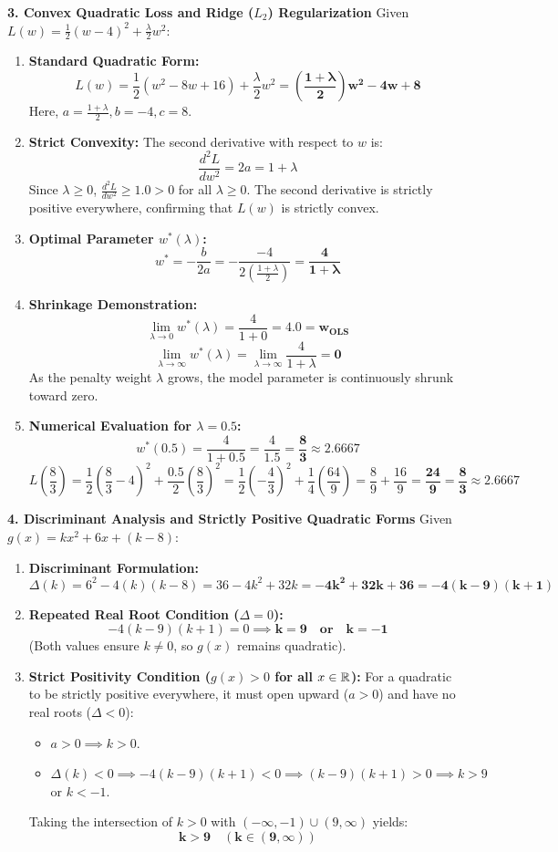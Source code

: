 \textbf{3. Convex Quadratic Loss and Ridge ($L_2$) Regularization}
Given $L(w) = \frac{1}{2}(w - 4)^2 + \frac{\lambda}{2} w^2$:
\begin{enumerate}
    \item \textbf{Standard Quadratic Form:}
    $$L(w) = \frac{1}{2}(w^2 - 8w + 16) + \frac{\lambda}{2}w^2 = \mathbf{\left(\frac{1 + \lambda}{2}\right)w^2 - 4w + 8}$$
    Here, $a = \frac{1 + \lambda}{2}, b = -4, c = 8$.
    \item \textbf{Strict Convexity:}
    The second derivative with respect to $w$ is:
    $$\frac{d^2 L}{dw^2} = 2a = 1 + \lambda$$
    Since $\lambda \ge 0$, $\frac{d^2 L}{dw^2} \ge 1.0 > 0$ for all $\lambda \ge 0$. The second derivative is strictly positive everywhere, confirming that $L(w)$ is strictly convex.
    \item \textbf{Optimal Parameter $w^*(\lambda)$:}
    $$w^* = -\frac{b}{2a} = -\frac{-4}{2\left(\frac{1 + \lambda}{2}\right)} = \mathbf{\frac{4}{1 + \lambda}}$$
    \item \textbf{Shrinkage Demonstration:}
    $$\lim_{\lambda \to 0} w^*(\lambda) = \frac{4}{1 + 0} = \mathbf{4.0 = w_{\text{OLS}}}$$
    $$\lim_{\lambda \to \infty} w^*(\lambda) = \lim_{\lambda \to \infty} \frac{4}{1 + \lambda} = \mathbf{0}$$
    As the penalty weight $\lambda$ grows, the model parameter is continuously shrunk toward zero.
    \item \textbf{Numerical Evaluation for $\lambda = 0.5$:}
    $$w^*(0.5) = \frac{4}{1 + 0.5} = \frac{4}{1.5} = \mathbf{\frac{8}{3} \approx 2.6667}$$
    $$L\left(\frac{8}{3}\right) = \frac{1}{2}\left(\frac{8}{3} - 4\right)^2 + \frac{0.5}{2}\left(\frac{8}{3}\right)^2 = \frac{1}{2}\left(-\frac{4}{3}\right)^2 + \frac{1}{4}\left(\frac{64}{9}\right) = \frac{8}{9} + \frac{16}{9} = \mathbf{\frac{24}{9} = \frac{8}{3} \approx 2.6667}$$
\end{enumerate}

\textbf{4. Discriminant Analysis and Strictly Positive Quadratic Forms}
Given $g(x) = k x^2 + 6x + (k - 8)$:
\begin{enumerate}
    \item \textbf{Discriminant Formulation:}
    $$\Delta(k) = 6^2 - 4(k)(k - 8) = 36 - 4k^2 + 32k = \mathbf{-4k^2 + 32k + 36 = -4(k - 9)(k + 1)}$$
    \item \textbf{Repeated Real Root Condition ($\Delta = 0$):}
    $$-4(k - 9)(k + 1) = 0 \implies \mathbf{k = 9 \quad \text{or} \quad k = -1}$$
    (Both values ensure $k \neq 0$, so $g(x)$ remains quadratic).
    \item \textbf{Strict Positivity Condition ($g(x) > 0$ for all $x \in \mathbb{R}$):}
    For a quadratic to be strictly positive everywhere, it must open upward ($a > 0$) and have no real roots ($\Delta < 0$):
    \begin{itemize}
        \item $a > 0 \implies k > 0$.
        \item $\Delta(k) < 0 \implies -4(k - 9)(k + 1) < 0 \implies (k - 9)(k + 1) > 0 \implies k > 9$ or $k < -1$.
    \end{itemize}
    Taking the intersection of $k > 0$ with $(-\infty, -1) \cup (9, \infty)$ yields:
    $$\mathbf{k > 9 \quad (k \in (9, \infty))}$$
\end{enumerate}

